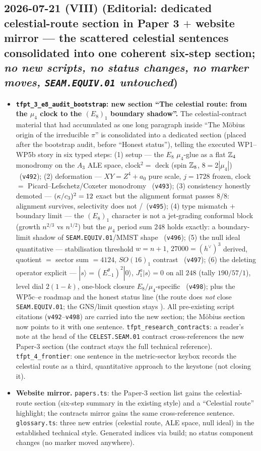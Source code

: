 \subsection*{2026-07-21 (VIII) (Editorial: dedicated celestial-route section in Paper 3 $+$ website mirror --- the scattered celestial sentences consolidated into one coherent six-step section; \emph{no new scripts, no status changes, no marker moves, \texttt{SEAM.EQUIV.01} untouched})}
\begin{itemize}[leftmargin=1.5em]
\item \textbf{\texttt{tfpt\_3\_e8\_audit\_bootstrap}: new section ``The celestial route: from the
$\mu_4$ clock to the $(E_8)_1$ boundary shadow''.} The celestial-contract material that had accumulated
as one long paragraph inside ``The M\"obius origin of the irreducible $\pi$'' is consolidated into a
dedicated section (placed after the bootstrap audit, before ``Honest status''), telling the executed
WP1--WP5b story in six typed steps: (1) setup --- the $E_8$ $\mu_4$-glue as a flat $\mathbb{Z}_4$ monodromy on
the $A_3$ ALE space, clock$^2=$ deck (spin $\mathbb{Z}_8$, $8=2|\mu_4|$) \mE\ (\texttt{v492}); (2) deformation
--- $XY=Z^4{+}a_0$ pure scale, $j=1728$ frozen, clock $=$ Picard--Lefschetz/Coxeter monodromy \mE\
(\texttt{v493}); (3) consistency honestly demoted --- $(\kappa/c_3)^2=12$ exact but the alignment
format passes $8/8$: alignment survives, selectivity does not \mE/\mC\ (\texttt{v495}); (4) type
mismatch $+$ boundary limit --- the $(E_8)_1$ character is not a jet-grading conformal block (growth
$n^{2/3}$ vs $n^{1/2}$) but the $\mu_4$ period sum $248$ holds exactly: a boundary-limit shadow of
\texttt{SEAM.EQUIV.01}/MMST shape \mE\ (\texttt{v496}); (5) the null ideal quantitative --- stabilisation
threshold $w=n{+}1$, $27000=(h^\vee)^3$ derived, quotient $=$ sector sum $=4124$, $SO(16)_1$ contrast
\mE\ (\texttt{v497}); (6) the deleting operator explicit --- $|s\rangle=(E^\theta_{-1})^2|0\rangle$,
$J^a_1|s\rangle=0$ on all $248$ (tally $190/57/1$), level dial $2(1{-}k)$, one-block closure
$E_8/\mu_4$-specific \mE\ (\texttt{v498}); plus the WP5c--e roadmap and the honest status line (the route
does \emph{not} close \texttt{SEAM.EQUIV.01}; the GNS/limit question stays \mO). All pre-existing script
citations (\texttt{v492}--\texttt{v498}) are carried into the new section; the M\"obius section now
points to it with one sentence. \texttt{tfpt\_research\_contracts}: a reader's note at the head of the \texttt{CELEST.SEAM.01}
contract cross-references the new Paper-3 section (the contract stays the full technical reference).
\texttt{tfpt\_4\_frontier}: one sentence in the metric-sector keybox records the celestial route as a
third, quantitative approach to the keystone (not closing it).
\item \textbf{Website mirror.} \texttt{papers.ts}: the Paper-3 section list gains the celestial-route
section (six-step summary in the existing style) and a ``Celestial route'' highlight; the contracts
mirror gains the same cross-reference sentence. \texttt{glossary.ts}: three new entries (celestial
route, ALE space, null ideal) in the established technical style. Generated indices via build; no
status component changes (no marker moved anywhere).
\end{itemize}


